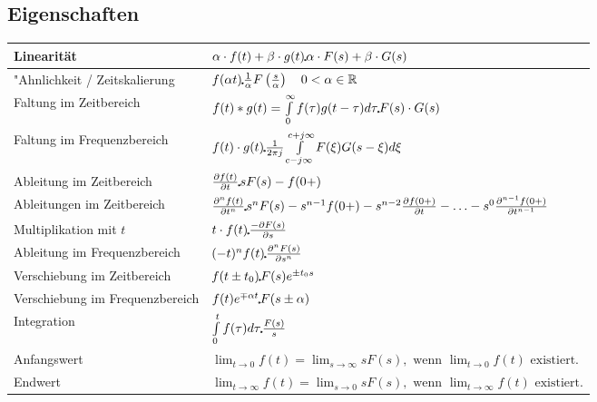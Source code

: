  	\subsection{Eigenschaften}
  		\renewcommand{\arraystretch}{2}
		\begin{tabular}{|p{6cm}|p{11cm}|}
        	\hline
        	Linearität & 
 			$\alpha\cdot f(t) + \beta\cdot g(t) \FT \alpha\cdot F(s) + \beta\cdot
 			G(s)$ \\
 			\hline
 			"Ahnlichkeit / Zeitskalierung &
 			$f(\alpha t) \FT \frac{1}{\alpha}F \left (\frac{s}{\alpha} \right ) \quad 0
 			<\alpha \in\mathbb{R}$ \\
 			\hline
 			Faltung im Zeitbereich &
 			$f(t) \ast g(t) = \int\limits_{0}^{\infty} f(\tau)g(t-\tau)d\tau \FT F(s)
 			\cdot G(s)$\\
 			\hline
 			Faltung im Frequenzbereich &
 			$f(t) \cdot g(t) \FT \frac{1}{2\pi j}\int\limits_{c-j\infty}^{c+j\infty}
 			F(\xi) G(s-\xi)d\xi$ \\
 			\hline
 			Ableitung im Zeitbereich &
 			$\frac{\partial f(t)}{\partial t} \FT sF(s)
 			-f(0+)$ \\
 			\hline
 			Ableitungen im Zeitbereich &
 			$\frac{\partial^n f(t)}{\partial t^n} \FT s^nF(s)
 			-s^{n-1}f(0+)-s^{n-2}\frac{\partial f(0+)}{\partial t}-\ldots
 			-s^0\frac{\partial^{n-1} f(0+)}{\partial t^{n-1}}$ \\
 			\hline
 			Multiplikation mit $t$ &
 			$t\cdot f(t)  \FT \frac{-\partial F(s)}{\partial s}$ \\
 			\hline
 			Ableitung im Frequenzbereich &
 			$(-t)^n f(t) \FT  \frac{\partial^n F(s)}{\partial s^n}$ \\
 			\hline
 			Verschiebung im Zeitbereich &
 			$f(t\pm t_0) \FT F(s)e^{\pm t_0 s}$ \\
 			\hline
 			Verschiebung im Frequenzbereich &
 			$f(t)e^{\mp\alpha t} \FT F(s\pm\alpha)$ \\
 			\hline
 			Integration &
 			$\int\limits_0^t f(\tau)d\tau \FT \frac{F(s)}{s}$ \\
 			\hline
 			Anfangswert &
 			$\lim_{t\rightarrow 0} f(t) = \lim_{s\rightarrow \infty} sF(s),\text{~wenn
 			}  \lim_{t\rightarrow 0} f(t)\text{~existiert}.$ \\
 			\hline
 			Endwert &
 			$\lim_{t\rightarrow \infty} f(t) = \lim_{s\rightarrow 0} sF(s),\text{~wenn
 			}  \lim_{t\rightarrow \infty} f(t)\text{~existiert}.$ \\
 			\hline
       	\end{tabular}
		\renewcommand{\arraystretch}{1}
		
